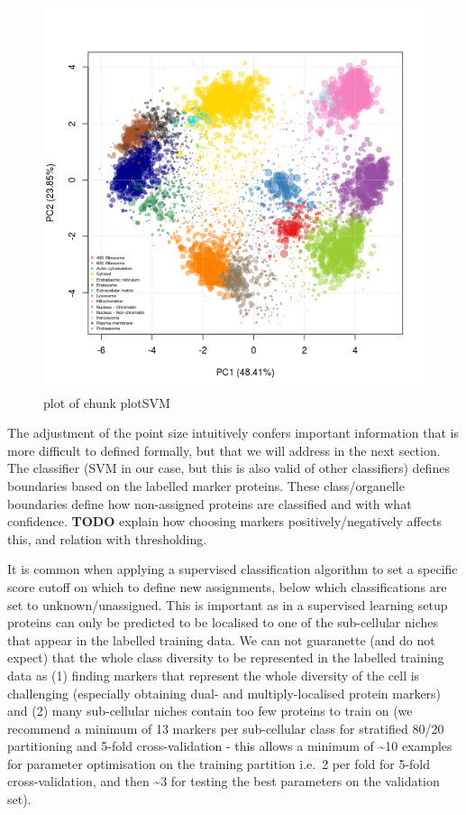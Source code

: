 \begin{figure}[htbp]
\centering
\includegraphics{figure/plotSVM-1.png}
\caption{plot of chunk plotSVM}
\end{figure}

The adjustment of the point size intuitively confers important
information that is more difficult to defined formally, but that we will
address in the next section. The classifier (SVM in our case, but this
is also valid of other classifiers) defines boundaries based on the
labelled marker proteins. These class/organelle boundaries define how
non-assigned proteins are classified and with what confidence.
\textbf{TODO} explain how choosing markers positively/negatively affects
this, and relation with thresholding.


It is common when applying a supervised classification algorithm to set
a specific score cutoff on which to define new assignments, below which
classifications are set to unknown/unassigned. This is important as in a
supervised learning setup proteins can only be predicted to be localised
to one of the sub-cellular niches that appear in the labelled training
data. We can not guaranette (and do not expect) that the whole class
diversity to be represented in the labelled training data as (1) finding
markers that represent the whole diversity of the cell is challenging
(especially obtaining dual- and multiply-localised protein markers) and
(2) many sub-cellular niches contain too few proteins to train on (we
recommend a minimum of 13 markers per sub-cellular class for stratified
80/20 partitioning and 5-fold cross-validation - this allows a minimum
of \textasciitilde{}10 examples for parameter optimisation on the
training partition i.e.~2 per fold for 5-fold cross-validation, and then
\textasciitilde{}3 for testing the best parameters on the validation
set).

